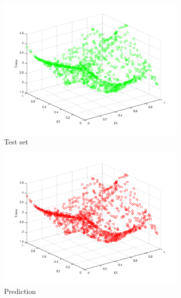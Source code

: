 \documentclass[a4paper, 10pt]{article}
\begin{document}
  \begin{figure}[htb]
    \begin{adjustwidth}{-1.1cm}{-1.1cm}
    \centering
    \begin{subfigure}[t]{0.31\linewidth}
      \includegraphics[width=1\linewidth]{./project/scatter_ytest_green.png}
      \caption{Test set}
    \end{subfigure}
    \begin{subfigure}[t]{0.31\linewidth}
      \includegraphics[width=1\linewidth]{./project/scatter_ysim.png}
      \caption{Prediction}
      \label{fig:overfit}
    \end{subfigure}
    \begin{subfigure}[t]{0.29\linewidth}

\end{subfigure}
\end{adjustwidth}
\end{figure}
\end{document}

